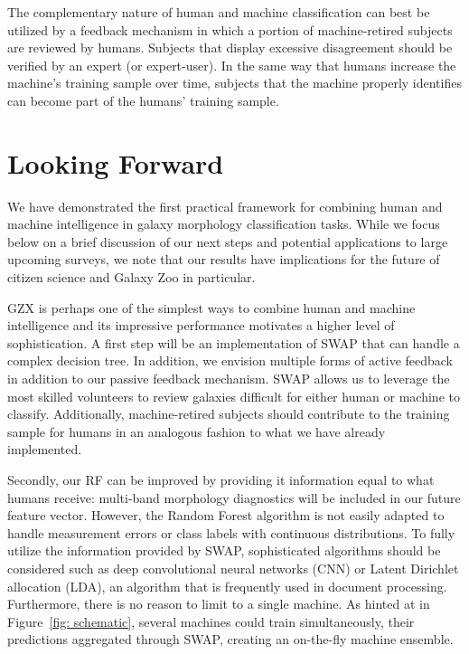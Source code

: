 \documentclass[twocolumn,  trackchanges,]{aastex6}%
\begin{document}
The complementary nature of human and machine classification can 
best be utilized by a feedback mechanism in which a portion of machine-retired
subjects are reviewed by humans. Subjects that display excessive disagreement
should be verified by an expert (or expert-user).  In the same way that 
humans increase the machine's training sample over time, subjects that the
machine properly identifies can become part of the humans' training sample. 



\section{Looking Forward}\label{sec: visions}

We have demonstrated the first practical framework for combining human and machine
 intelligence in galaxy morphology classification tasks. 
While we focus below on a brief discussion of our next steps and potential applications
to large upcoming surveys, we note that our results have implications for the future
of citizen science and Galaxy Zoo in particular. 


GZX is perhaps one of the simplest ways to combine human and machine intelligence
 and its impressive performance motivates a higher level of sophistication. 
A first step will be an implementation of SWAP that can handle a complex decision tree. 
In addition, we envision multiple forms of active feedback in addition to 
our passive feedback mechanism.  SWAP allows us to leverage the 
most skilled volunteers to review galaxies difficult for either
 human or machine to classify.  Additionally, machine-retired subjects should 
contribute to the training sample for humans in an analogous fashion to what 
we have already implemented. 


Secondly, our RF can be improved by providing it information equal to what
humans receive: multi-band morphology diagnostics will be
included in our future feature vector.  However, the Random Forest algorithm is not 
easily adapted to handle measurement errors or class labels with continuous distributions. 
To fully utilize the information provided by SWAP, sophisticated algorithms should be considered such as 
deep convolutional neural networks (CNN) or Latent Dirichlet allocation (LDA), 
an algorithm that is frequently used in document processing.  
Furthermore, there is no reason to limit to a single machine. 
As hinted at in Figure~\ref{fig: schematic}, several machines could train simultaneously, 
their predictions aggregated through SWAP, creating an on-the-fly machine ensemble.
\end{document}
